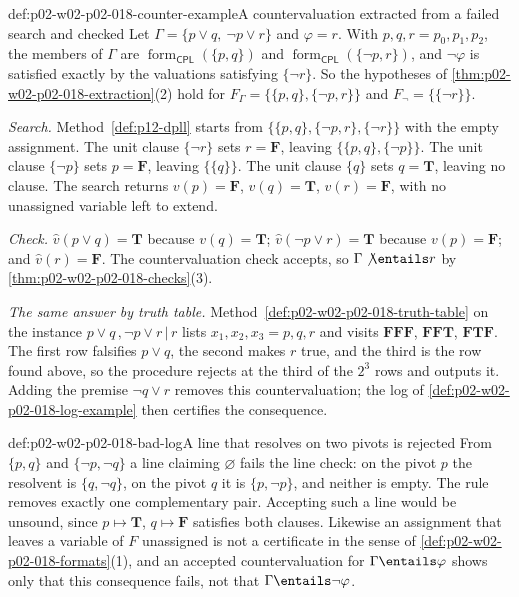 \begin{hbexample}{def:p02-w02-p02-018-counter-example}{A countervaluation extracted from a failed search and checked}
Let \(\Gamma=\{p\lor q,\ \neg p\lor r\}\) and \(\varphi=r\).  With
\(p,q,r=p_0,p_1,p_2\), the members of \(\Gamma\) are
\(\operatorname{form}_{\mathsf{CPL}}(\{p,q\})\) and
\(\operatorname{form}_{\mathsf{CPL}}(\{\neg p,r\})\), and \(\neg\varphi\)
is satisfied exactly by the valuations satisfying \(\{\neg r\}\).  So the
hypotheses of \cref{thm:p02-w02-p02-018-extraction}(2) hold for
\(F_\Gamma=\bigl\{\{p,q\},\{\neg p,r\}\bigr\}\) and
\(F_\neg=\bigl\{\{\neg r\}\bigr\}\).

\emph{Search.}  Method~\ref{def:p12-dpll} starts from
\(\bigl\{\{p,q\},\{\neg p,r\},\{\neg r\}\bigr\}\) with the empty assignment.
The unit clause \(\{\neg r\}\) sets \(r=\mathbf F\), leaving
\(\bigl\{\{p,q\},\{\neg p\}\bigr\}\).  The unit clause \(\{\neg p\}\) sets
\(p=\mathbf F\), leaving \(\bigl\{\{q\}\bigr\}\).  The unit clause \(\{q\}\)
sets \(q=\mathbf T\), leaving no clause.  The search returns
\(v(p)=\mathbf F\), \(v(q)=\mathbf T\), \(v(r)=\mathbf F\), with no
unassigned variable left to extend.

\emph{Check.}  \(\widehat v(p\lor q)=\mathbf T\) because
\(v(q)=\mathbf T\); \(\widehat v(\neg p\lor r)=\mathbf T\) because
\(v(p)=\mathbf F\); and \(\widehat v(r)=\mathbf F\).  The countervaluation
check accepts, so \(\Gamma\not\entails r\) by
\cref{thm:p02-w02-p02-018-checks}(3).

\emph{The same answer by truth table.}  Method~\ref{def:p02-w02-p02-018-truth-table}
on the instance \(p\lor q\,\texttt{,}\,\neg p\lor r\,\texttt{|}\,r\) lists
\(x_1,x_2,x_3=p,q,r\) and visits \(\mathbf{FFF}\), \(\mathbf{FFT}\),
\(\mathbf{FTF}\).  The first row falsifies \(p\lor q\), the second makes
\(r\) true, and the third is the row found above, so the procedure rejects at
the third of the \(2^3\) rows and outputs it.  Adding the premise
\(\neg q\lor r\) removes this countervaluation; the log of
\cref{def:p02-w02-p02-018-log-example} then certifies the consequence.
\end{hbexample}

\begin{hbwarning}{def:p02-w02-p02-018-bad-log}{A line that resolves on two pivots is rejected}
From \(\{p,q\}\) and \(\{\neg p,\neg q\}\) a line claiming
\(\varnothing\) fails the line check: on the pivot \(p\) the resolvent is
\(\{q,\neg q\}\), on the pivot \(q\) it is \(\{p,\neg p\}\), and neither is
empty.  The rule removes exactly one complementary pair.  Accepting such a line
would be unsound, since \(p\mapsto\mathbf T\), \(q\mapsto\mathbf F\) satisfies
both clauses.  Likewise an assignment that leaves a variable of \(F\)
unassigned is not a certificate in the sense of
\cref{def:p02-w02-p02-018-formats}(1), and an accepted countervaluation for
\(\Gamma\entails\varphi\) shows only that this consequence fails, not that
\(\Gamma\entails\neg\varphi\).
\end{hbwarning}

